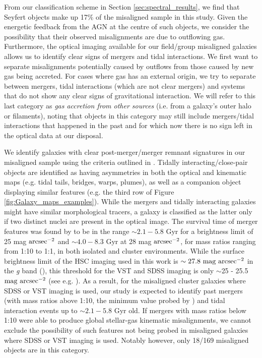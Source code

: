 \documentclass[fleqn,usenatbib]{mnras}
\begin{document}
From our classification scheme in Section \ref{sec:spectral_results}, we find that Seyfert objects make up 17$\%$ of the misaligned sample in this study. Given the energetic feedback from the AGN at the centre of such objects, we consider the possibility that their observed misalignments are due to outflowing gas. Furthermore, the optical imaging available for our field/group misaligned galaxies allows us to identify clear signs of mergers and tidal interactions.
We first want to separate misalignments potentially caused by outflows from those caused by new gas being accreted.
For cases where gas has an external origin, we try to separate between mergers, tidal interactions (which are
not clear mergers) and systems that do not show any clear signs of gravitational interaction. We will refer to
this last category as \textit{gas accretion from other sources} (i.e. from a galaxy's outer halo or filaments), noting that objects in this category may still include mergers/tidal interactions that happened in the past and for which now there is no sign left in the optical data at our disposal.

We identify galaxies with clear post-merger/merger remnant signatures in our misaligned sample using the criteria outlined in \cite{Barreraballesteros2015}.
Tidally interacting/close-pair objects are identified as having asymmetries in both the optical and kinematic maps (e.g. tidal tails, bridges, warps, plumes), as well as a companion object displaying similar features (e.g. the third row of Figure \ref{fig:Galaxy_maps_examples}). While the mergers and tidally interacting galaxies might have similar morphological tracers, a galaxy is classified as the latter only if two distinct nuclei are present in the optical image.  
The survival time of merger features was found by \cite{Ji2014Mergers2} to be in the range $\sim2.1-5.8$ Gyr for a brightness limit of 25 mag $\rm{arcsec^{-2}}$ and $\sim4.0-8.3$ Gyr at 28 mag $\rm{arcsec^{-2}}$, for mass ratios ranging from 1:10 to 1:1, in both isolated and cluster environments. While the surface brightness limit of the HSC imaging used in this work is $\sim 27.8\ \rm{mag\ arcsec^{-2}}$  in the \textit{g} band (\citealt{HSC_LSBG}), this threshold for the VST and SDSS imaging is only $\sim$25 - 25.5 $\rm{mag\ arcsec^{-2}}$ (see e.g. \citealt{Arnaboldi1999,Ji2014Mergers2}). As a result, for the misaligned cluster galaxies where SDSS or VST imaging is used, our study is expected to identify past mergers (with mass ratios above 1:10, the minimum value probed by \citealt{Ji2014Mergers2}) and tidal interaction events up to $\sim2.1-5.8$ Gyr old. If mergers with mass ratios below 1:10 were able to produce global stellar-gas kinematic misalignments, we cannot exclude the possibility of such features not being probed in misaligned galaxies where SDSS or VST imaging is used. Notably however, only 18/169 misaligned objects are in this category. 
\end{document}
